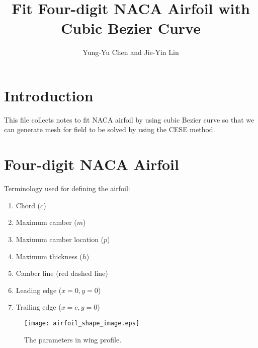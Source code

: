\documentclass{turgon}
\title{
%
Fit Four-digit NACA Airfoil with Cubic Bezier Curve
%
}
\author{
%
Yung-Yu Chen and Jie-Yin Lin
%
}
\begin{document}
\maketitle

\tableofcontents

\chapter*{Introduction}

This file collects notes to fit NACA airfoil by using cubic Bezier curve so
that we can generate mesh for field to be solved by using the CESE
method\cite{chang_method_1995}.

\chapter{Four-digit NACA Airfoil}


Terminology used for defining the airfoil:
\begin{enumerate}
    \item
    Chord ($c$)
    \item
    Maximum camber ($m$)
    \item
    Maximum camber location ($p$)
    \item
    Maximum thickness ($h$)
    \item
    Camber line (red dashed line)
    \item
    Leading edge ($x = 0, y = 0$)
    \item
    Trailing edge ($x = c, y = 0$)
\end{enumerate}
\begin{figure}[h]
    \centering
    \texttt{[image: airfoil\_shape\_image.eps]}
    \caption{The parameters in wing profile.}
    \label{f:airfoil_shape_image}
\end{figure}
\end{document}
